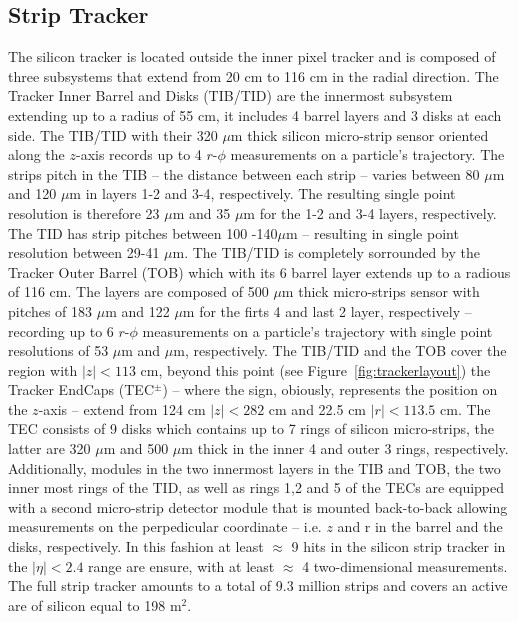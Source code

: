 \subsection{Strip Tracker}
The silicon tracker is located outside the inner pixel tracker and is
composed of three subsystems that extend from 20 cm to 116 cm in the
radial direction. The Tracker Inner Barrel and Disks (TIB/TID) are
the innermost subsystem extending up to a radius of 55 cm, it includes
4 barrel layers and 3 disks at each side. The TIB/TID with their 320
$\mu$m thick silicon micro-strip sensor oriented along the $z$-axis records up to 4 $r$-$\phi$
measurements on a particle's trajectory. The strips pitch  in the TIB -- the
distance between each strip -- varies between 80 $\mu$m and 120 $\mu$m
in layers 1-2 and 3-4, respectively. The resulting single point
resolution is therefore 23 $\mu$m and 35 $\mu$m for the 1-2 and 3-4
layers, respectively. The TID has strip pitches between 100 -140$\mu$m
-- resulting in single point resolution between 29-41 $\mu$m. The
TIB/TID is completely sorrounded by the Tracker Outer Barrel (TOB)
which with its 6 barrel layer extends up to a radious of 116 cm. The
layers are composed of 500 $\mu$m thick micro-strips sensor with
pitches of 183 $\mu$m and 122 $\mu$m for the firts 4  and last 2
layer, respectively -- recording up to 6 $r$-$\phi$
measurements on a particle's trajectory with single point resolutions of 53 $\mu$m
and $\mu$m, respectively. The TIB/TID and the TOB cover the region
with $|z|< 113$ cm, beyond this point (see
Figure~\ref{fig:trackerlayout}) the Tracker EndCaps (TEC$^{\pm}$) --
where the sign, obiously, represents the position on the $z$-axis --
extend from 124 cm $|z|< 282$ cm and 22.5 cm $|r|< 113.5$ cm. The TEC
consists of 9 disks which contains up to 7 rings of silicon
micro-strips, the latter are 320 $\mu$m and 500 $\mu$m thick in the
inner 4 and outer 3 rings, respectively.
Additionally, modules in the two innermost layers in the TIB and TOB,
the two inner most rings of the TID, as well as rings 1,2 and 5 of the TECs are
equipped with a second micro-strip detector module that is mounted
back-to-back allowing measurements on the perpedicular coordinate --
i.e. $z$ and r in the barrel and the disks, respectively. In this
fashion at least $\approx$ 9 hits in the silicon strip tracker in the
$|\eta|<2.4$ range are ensure, with at least $\approx$ 4
two-dimensional measurements. The full strip tracker amounts to a
total of 9.3 million strips and covers an active are of silicon equal
to 198 m$^2$.

